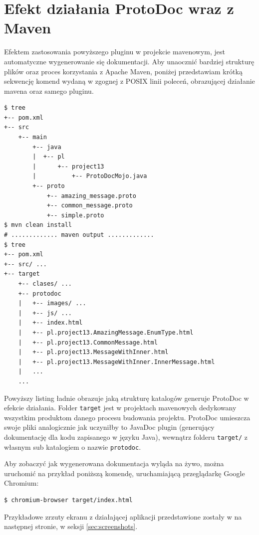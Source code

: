 \documentclass[pdflatex,11pt]{aghdpl}
\begin{document}
\section{Efekt działania ProtoDoc wraz z Maven}
Efektem zastosowania powyższego pluginu w projekcie mavenowym, jest automatyczne wygenerowanie się dokumentacji.
Aby unaocznić bardziej strukturę plików oraz proces korzystania z Apache Maven, poniżej przedstawiam krótką sekwencję komend
wydaną w zgognej z POSIX linii poleceń, obrazującej działanie mavena oraz samego pluginu.

\begin{verbatim}
$ tree
+-- pom.xml
+-- src
    +-- main
        +-- java
        |  +-- pl
        |      +-- project13
        |          +-- ProtoDocMojo.java
        +-- proto
            +-- amazing_message.proto
            +-- common_message.proto
            +-- simple.proto
$ mvn clean install
# ............. maven output .............
$ tree
+-- pom.xml
+-- src/ ...
+-- target
    +-- clases/ ...
    +-- protodoc
    |   +-- images/ ...
    |   +-- js/ ...
    |   +-- index.html 
    |   +-- pl.project13.AmazingMessage.EnumType.html
    |   +-- pl.project13.CommonMessage.html
    |   +-- pl.project13.MessageWithInner.html
    |   +-- pl.project13.MessageWithInner.InnerMessage.html
    |   ...
    ...
\end{verbatim}

Powyższy listing ładnie obrazuje jaką strukturę katalogów generuje ProtoDoc w efekcie działania.
Folder \verb|target| jest w projektach mavenowych dedykowany wszystkim produktom danego procesu budowania projektu.
ProtoDoc umieszcza swoje pliki analogicznie jak uczyniłby to JavaDoc plugin (generujący dokumentację dla kodu zapisanego w języku Java),
wewnątrz folderu \verb|target/| z własnym sub katalogiem o nazwie \verb|protodoc|.

Aby zobaczyć jak wygenerowana dokumentacja wyląda na żywo, można uruchomić na przykład poniższą komendę, uruchamiającą przeglądarkę Google Chromium:

\begin{lstlisting}
$ chromium-browser target/index.html
\end{lstlisting}

Przykładowe zrzuty ekranu z działającej aplikacji przedstawione zostały w na następnej stronie, w seksji \ref{sec:screenshots}.

\newpage
\end{document}
